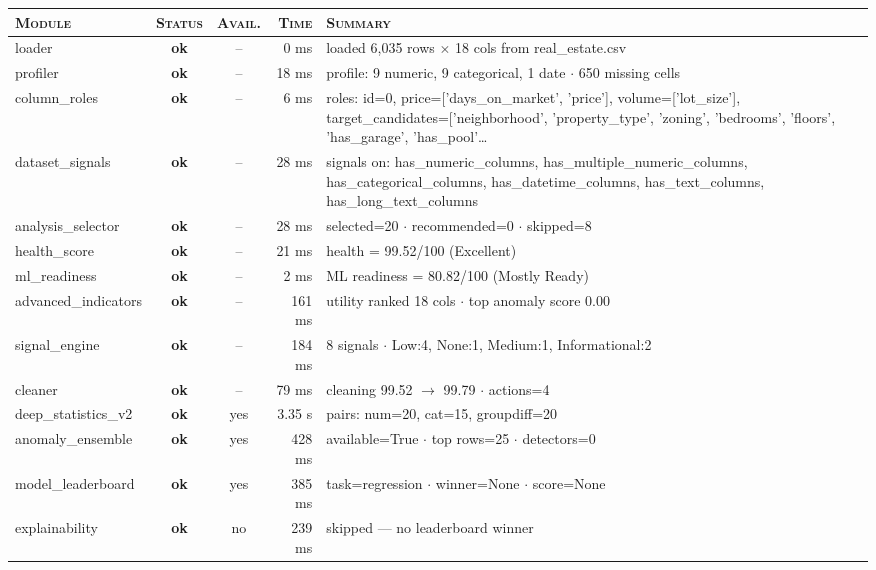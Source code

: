 \documentclass[11pt,a4paper]{article}
\begin{document}
\begin{tabularx}{\linewidth}{l c c r X}
\toprule
\textsc{Module} & \textsc{Status} & \textsc{Avail.} & \textsc{Time} & \textsc{Summary} \\
\midrule
  loader & \textcolor{ok}{\textbf{ok}} & -- & 0 ms & loaded 6,035 rows $\times$ 18 cols from real\_estate.csv \\
  profiler & \textcolor{ok}{\textbf{ok}} & -- & 18 ms & profile: 9 numeric, 9 categorical, 1 date $\cdot$ 650 missing cells \\
  column\_roles & \textcolor{ok}{\textbf{ok}} & -- & 6 ms & roles: id=0, price=['days\_on\_market', 'price'], volume=['lot\_size'], target\_candidates=['neighborhood', 'property\_type', 'zoning', 'bedrooms', 'floors', 'has\_garage', 'has\_pool'\ldots{} \\
  dataset\_signals & \textcolor{ok}{\textbf{ok}} & -- & 28 ms & signals on: has\_numeric\_columns, has\_multiple\_numeric\_columns, has\_categorical\_columns, has\_datetime\_columns, has\_text\_columns, has\_long\_text\_columns \\
  analysis\_selector & \textcolor{ok}{\textbf{ok}} & -- & 28 ms & selected=20 $\cdot$ recommended=0 $\cdot$ skipped=8 \\
  health\_score & \textcolor{ok}{\textbf{ok}} & -- & 21 ms & health = 99.52/100 (Excellent) \\
  ml\_readiness & \textcolor{ok}{\textbf{ok}} & -- & 2 ms & ML readiness = 80.82/100 (Mostly Ready) \\
  advanced\_indicators & \textcolor{ok}{\textbf{ok}} & -- & 161 ms & utility ranked 18 cols $\cdot$ top anomaly score 0.00 \\
  signal\_engine & \textcolor{ok}{\textbf{ok}} & -- & 184 ms & 8 signals $\cdot$ Low:4, None:1, Medium:1, Informational:2 \\
  cleaner & \textcolor{ok}{\textbf{ok}} & -- & 79 ms & cleaning 99.52 $\rightarrow$ 99.79 $\cdot$ actions=4 \\
  deep\_statistics\_v2 & \textcolor{ok}{\textbf{ok}} & \textcolor{ok}{yes} & 3.35 s & pairs: num=20, cat=15, groupdiff=20 \\
  anomaly\_ensemble & \textcolor{ok}{\textbf{ok}} & \textcolor{ok}{yes} & 428 ms & available=True $\cdot$ top rows=25 $\cdot$ detectors=0 \\
  model\_leaderboard & \textcolor{ok}{\textbf{ok}} & \textcolor{ok}{yes} & 385 ms & task=regression $\cdot$ winner=None $\cdot$ score=None \\
  explainability & \textcolor{ok}{\textbf{ok}} & \textcolor{ink3}{no} & 239 ms & skipped --- no leaderboard winner \\

\end{tabularx}
\end{document}
